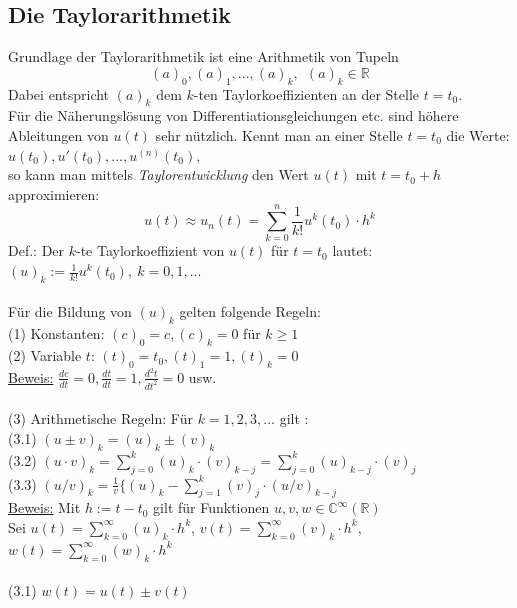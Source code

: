 \documentclass{scrartcl}
\begin{document}
\subsection{Die Taylorarithmetik}
Grundlage der Taylorarithmetik ist eine Arithmetik von Tupeln
$$(a)_0,(a)_1,...,(a)_k, \ \  (a)_k \in \mathbb{R}$$
Dabei entspricht $(a)_k$ dem $k$-ten Taylorkoeffizienten an der Stelle $t=t_0$.\\
Für die Näherungslösung von Differentiationsgleichungen etc. sind höhere Ableitungen von $u(t)$ sehr nützlich. Kennt man an einer Stelle $t=t_0$ die Werte: $u(t_0), u'(t_0), ... , u^{(n)}(t_0)$,\\
so kann man mittels \textit{Taylorentwicklung} den Wert $u(t)$ mit $t=t_0+h$ approximieren: \\
$$u(t)\approx u_n(t)=\sum\limits_{k=0}^{n}\frac{1}{k!}u^{k}(t_0)\cdot h^k$$
Def.: Der $k$-te Taylorkoeffizient von $u(t)$ für $t=t_0$ lautet: $(u)_k:=\frac{1}{k!}u^{k}(t_0),\ k=0,1,...$\\
\\
Für die Bildung von $(u)_k$ gelten folgende Regeln:\\
(1) Konstanten: $(c)_0=c, (c)_k = 0$ für $k \geq 1$\\
(2) Variable $t$: $(t)_0=t_0, (t)_1= 1, (t)_k =0$ \\
\hspace*{0.5cm} \underline{Beweis:} $\frac{dc}{dt}=0, \frac{dt}{dt}=1, \frac{d^2t}{dt^2}=0$ usw. \\
\\
(3) Arithmetische Regeln: Für $k=1,2,3,...$ gilt :\\
	(3.1) $(u\pm v)_k = (u)_k \pm (v)_k$ \\
	(3.2) $(u \cdot v)_k = \sum_{j=0}^k (u)_k \cdot (v)_{k-j} = \sum_{j=0}^k (u)_{k-j}\cdot(v)_j$\\
	(3.3) $(u/v)_k = \frac{1}{v}\{(u)_k - \sum_{j=1}^k (v)_j \cdot (u/v)_{k-j}$\\
\hspace*{0.5cm}\underline{Beweis:} Mit $h:= t-t_0$ gilt für Funktionen $u,v,w \in \mathbb{C}^{\infty}(\mathbb{R})$ \\
\hspace*{0.5cm}Sei $u(t)= \sum\limits_{k=0}^{\infty} (u)_k \cdot h^k$, $v(t)= \sum\limits_{k=0}^{\infty} (v)_k \cdot h^k$, $w(t)= \sum\limits_{k=0}^{\infty} (w)_k \cdot h^k$ \\
\\
\hspace*{0.5cm}(3.1) $w(t)= u(t)\pm v(t)$\\
\end{document}
